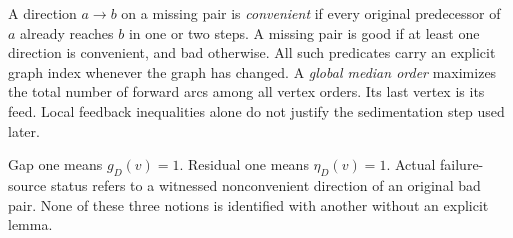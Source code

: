 A direction $a\to b$ on a missing pair is \emph{convenient} if every
original predecessor of $a$ already reaches $b$ in one or two steps.
A missing pair is good if at least one direction is convenient, and bad
otherwise. All such predicates carry an explicit graph index whenever the
graph has changed. A \emph{global median order} maximizes the total number
of forward arcs among all vertex orders. Its last vertex is its feed.
Local feedback inequalities alone do not justify the sedimentation step
used later.

\begin{remark}
Gap one means $g_D(v)=1$. Residual one means $\eta_D(v)=1$.
Actual failure-source status refers to a witnessed nonconvenient direction
of an original bad pair. None of these three notions is identified with
another without an explicit lemma.
\end{remark}
